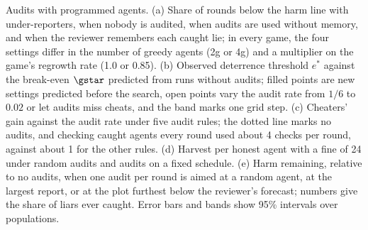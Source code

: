 Audits with programmed agents. (a) Share of rounds below the harm line with under-reporters, when nobody is audited, when audits are used without memory, and when the reviewer remembers each caught lie; in every game, the four settings differ in the number of greedy agents (2g or 4g) and a multiplier on the game's regrowth rate (1.0 or 0.85). (b) Observed deterrence threshold $e^*$ against the break-even $\gstar$ predicted from runs without audits; filled points are new settings predicted before the search, open points vary the audit rate from $1/6$ to $0.02$ or let audits miss cheats, and the band marks one grid step. (c) Cheaters' gain against the audit rate under five audit rules; the dotted line marks no audits, and checking caught agents every round used about 4 checks per round, against about 1 for the other rules. (d) Harvest per honest agent with a fine of 24 under random audits and audits on a fixed schedule. (e) Harm remaining, relative to no audits, when one audit per round is aimed at a random agent, at the largest report, or at the plot furthest below the reviewer's forecast; numbers give the share of liars ever caught. Error bars and bands show 95\% intervals over populations.
